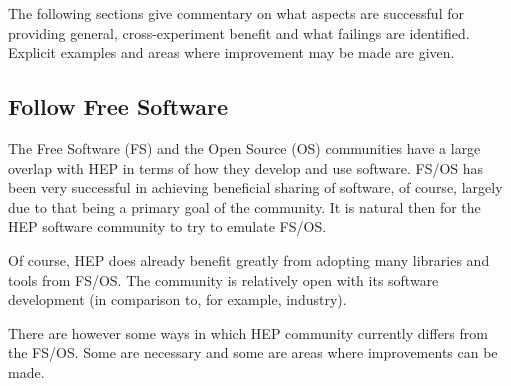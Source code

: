 The following sections give commentary on what aspects are successful
for providing general, cross-experiment benefit and what failings are
identified.  Explicit examples and areas where improvement may be made are given.

\subsection{Follow Free Software}

The Free Software (FS) and the Open Source (OS) communities have a
large overlap with HEP in terms of how they develop and use software.
FS/OS has been very successful in achieving beneficial sharing of
software, of course, largely due to that being a primary goal of the
community.  It is natural then for the HEP software community to try
to emulate FS/OS.

Of course, HEP does already benefit greatly from adopting many
libraries and tools from FS/OS.  The community is relatively open with
its software development (in comparison to, for example, industry).  

There are however some ways in which HEP community currently differs
from the FS/OS.  Some are necessary and some are areas where
improvements can be made.

